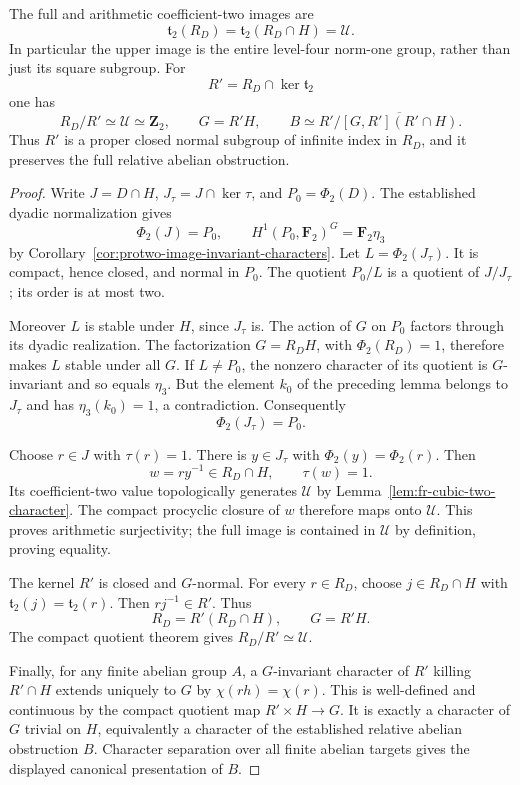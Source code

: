 \begin{theorem}\label{thm:fr-cubic-two-exact-image}
The full and arithmetic coefficient-two images are
\[
 \boxed{\quad
 \mathfrak t_2(R_D)
   =\mathfrak t_2(R_D\cap H)
   =\mathcal U.
 \quad}
\]
In particular the upper image is the entire level-four norm-one
group, rather than just its square subgroup.
For
\[
                    R'=R_D\cap\ker\mathfrak t_2
\]
one has
\[
 R_D/R'\simeq\mathcal U\simeq\mathbf Z_2,\qquad
 G=R'H,\qquad
 B\simeq R'/\overline{[G,R'](R'\cap H)}.
\]
Thus \(R'\) is a proper closed normal subgroup of infinite index in
\(R_D\), and it preserves the full relative abelian obstruction.
\end{theorem}

\begin{proof}
Write \(J=D\cap H\), \(J_\tau=J\cap\ker\tau\), and
\(P_0=\Phi_2(D)\). The established dyadic normalization gives
\[
 \Phi_2(J)=P_0,\qquad
 H^1(P_0,\mathbf F_2)^G=\mathbf F_2\eta_3
\]
by Corollary~\ref{cor:protwo-image-invariant-characters}.
Let \(L=\Phi_2(J_\tau)\).
It is compact, hence closed, and normal in \(P_0\).
The quotient \(P_0/L\) is a quotient of \(J/J_\tau\); its order
is at most two.

Moreover \(L\) is stable under \(H\), since \(J_\tau\) is.
The action of \(G\) on \(P_0\) factors through its dyadic realization.
The factorization \(G=R_DH\), with \(\Phi_2(R_D)=1\), therefore
makes \(L\) stable under all \(G\).
If \(L\ne P_0\), the nonzero character of its quotient is
\(G\)-invariant and so equals \(\eta_3\).
But the element \(k_0\) of the preceding lemma belongs to
\(J_\tau\) and has \(\eta_3(k_0)=1\), a contradiction.
Consequently
\[
                         \Phi_2(J_\tau)=P_0.
\]

Choose \(r\in J\) with \(\tau(r)=1\).
There is \(y\in J_\tau\) with
\(\Phi_2(y)=\Phi_2(r)\). Then
\[
                         w=ry^{-1}\in R_D\cap H,
 \qquad \tau(w)=1.
\]
Its coefficient-two value topologically generates \(\mathcal U\)
by Lemma~\ref{lem:fr-cubic-two-character}.
The compact procyclic closure of \(w\) therefore maps onto
\(\mathcal U\). This proves arithmetic surjectivity; the full image
is contained in \(\mathcal U\) by definition, proving equality.

The kernel \(R'\) is closed and \(G\)-normal. For every \(r\in R_D\),
choose \(j\in R_D\cap H\) with
\(\mathfrak t_2(j)=\mathfrak t_2(r)\). Then \(rj^{-1}\in R'\).
Thus
\[
 R_D=R'(R_D\cap H),\qquad G=R'H.
\]
The compact quotient theorem gives \(R_D/R'\simeq\mathcal U\).

Finally, for any finite abelian group \(A\), a \(G\)-invariant
character of \(R'\) killing \(R'\cap H\) extends uniquely to
\(G\) by \(\chi(rh)=\chi(r)\). This is well-defined and
continuous by the compact quotient map \(R'\times H\to G\).
It is exactly a character of \(G\) trivial on \(H\), equivalently
a character of the established relative abelian obstruction \(B\).
Character separation over all finite abelian targets gives the
displayed canonical presentation of \(B\).
\end{proof}

